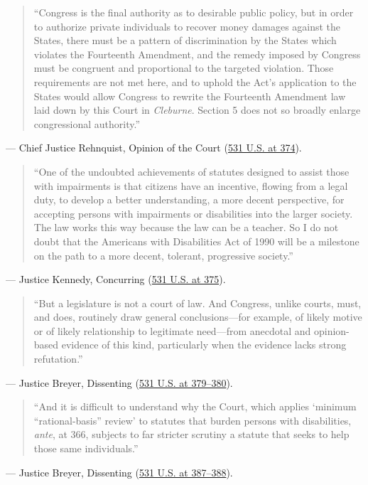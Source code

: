 \documentclass[12pt]{article}
\begin{document}
\begin{quote}
``Congress is the final authority as to desirable public policy, but in order to authorize private individuals to recover money damages against the States, there must be a pattern of discrimination by the States which violates the Fourteenth Amendment, and the remedy imposed by Congress must be congruent and proportional to the targeted violation. Those requirements are not met here, and to uphold the Act's application to the States would allow Congress to rewrite the Fourteenth Amendment law laid down by this Court in \textit{Cleburne}. Section 5 does not so broadly enlarge congressional authority.''
\end{quote}
\noindent --- Chief Justice Rehnquist, Opinion of the Court (\href{https://supreme.justia.com/cases/federal/us/531/356/}{531 U.S. at 374}).

\begin{quote}
``One of the undoubted achievements of statutes designed to assist those with impairments is that citizens have an incentive, flowing from a legal duty, to develop a better understanding, a more decent perspective, for accepting persons with impairments or disabilities into the larger society. The law works this way because the law can be a teacher. So I do not doubt that the Americans with Disabilities Act of 1990 will be a milestone on the path to a more decent, tolerant, progressive society.''
\end{quote}
\noindent --- Justice Kennedy, Concurring (\href{https://supreme.justia.com/cases/federal/us/531/356/}{531 U.S. at 375}).

\begin{quote}
``But a legislature is not a court of law. And Congress, unlike courts, must, and does, routinely draw general conclusions---for example, of likely motive or of likely relationship to legitimate need---from anecdotal and opinion-based evidence of this kind, particularly when the evidence lacks strong refutation.''
\end{quote}
\noindent --- Justice Breyer, Dissenting (\href{https://supreme.justia.com/cases/federal/us/531/356/}{531 U.S. at 379--380}).

\begin{quote}
``And it is difficult to understand why the Court, which applies `minimum ``rational-basis'' review' to statutes that burden persons with disabilities, \textit{ante}, at 366, subjects to far stricter scrutiny a statute that seeks to help those same individuals.''
\end{quote}
\noindent --- Justice Breyer, Dissenting (\href{https://supreme.justia.com/cases/federal/us/531/356/}{531 U.S. at 387--388}).
\end{document}
